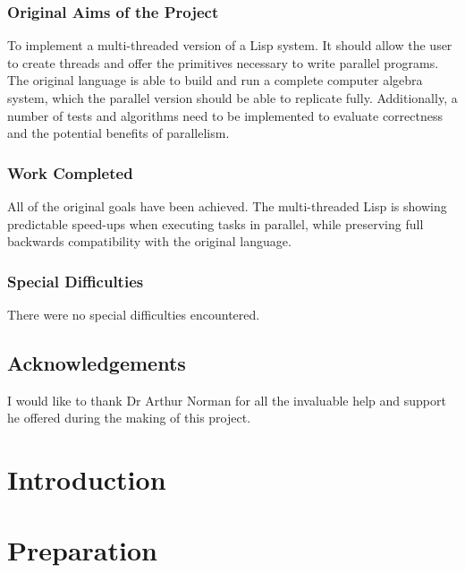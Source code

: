 \documentclass[a4paper,12pt,twoside,openright]{report}
\begin{document}
\subsection*{Original Aims of the Project}

To implement a multi-threaded version of a Lisp system. It should
allow the user to create threads and offer the primitives necessary to
write parallel programs. The original language is able to build and
run a complete computer algebra system, which the parallel version should
be able to replicate fully. Additionally, a number of tests and algorithms need to
be implemented to evaluate correctness and the potential benefits of parallelism.

\subsection*{Work Completed}

All of the original goals have been achieved. The multi-threaded Lisp
is showing predictable speed-ups when executing tasks in parallel,
while preserving full backwards compatibility with the original language.

\subsection*{Special Difficulties}
There were no special difficulties encountered.

\newpage

\section*{Acknowledgements}
I would like to thank Dr Arthur Norman for all the invaluable help
and support he offered during the making of this project.

\setcounter{tocdepth}{2}
\tableofcontents

\newpage


\pagestyle{headings}

\setcounter{page}{0}

\chapter{Introduction}
\label{ch:introduction}


\chapter{Preparation}
\label{ch:preparation}

\end{document}
